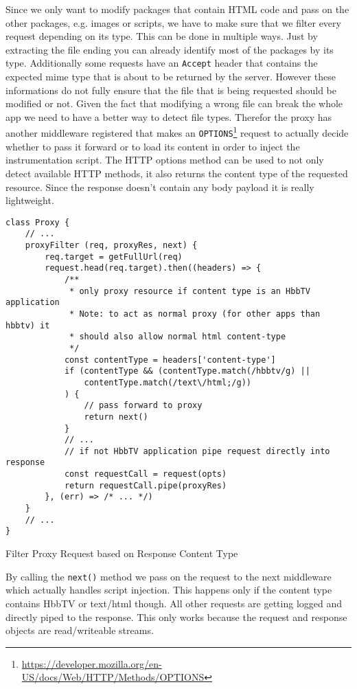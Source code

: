 Since we only want to modify packages that contain HTML code and pass on the other packages, e.g. images
or scripts, we have to make sure that we filter every request depending on its type. This can be done in
multiple ways. Just by extracting the file ending you can already identify most of the packages by its
type. Additionally some requests have an \texttt{Accept} header that contains the expected mime type that
is about to be returned by the server. However these informations do not fully ensure that the file that
is being requested should be modified or not. Given the fact that modifying a wrong file can break the
whole app we need to have a better way to detect file types. Therefor the proxy has another middleware
registered that makes an \texttt{OPTIONS}\footnote{\url{https://developer.mozilla.org/en-US/docs/Web/HTTP/Methods/OPTIONS}}
request to actually decide whether to pass it forward or to load its content in order to inject the
instrumentation script. The HTTP options method can be used to not only detect available HTTP methods,
it also returns the content type of the requested resource. Since the response doesn't contain any body
payload it is really lightweight.

\begin{listing}[H]
\begin{verbatim}
class Proxy {
    // ...
    proxyFilter (req, proxyRes, next) {
        req.target = getFullUrl(req)
        request.head(req.target).then((headers) => {
            /**
             * only proxy resource if content type is an HbbTV application
             * Note: to act as normal proxy (for other apps than hbbtv) it
             * should also allow normal html content-type
             */
            const contentType = headers['content-type']
            if (contentType && (contentType.match(/hbbtv/g) ||
                contentType.match(/text\/html;/g))
            ) {
                // pass forward to proxy
                return next()
            }
            // ...
            // if not HbbTV application pipe request directly into response
            const requestCall = request(opts)
            return requestCall.pipe(proxyRes)
        }, (err) => /* ... */)
    }
    // ...
}
\end{verbatim}
\caption{Filter Proxy Request based on Response Content Type}
\label{lst:proxyFilter}
\end{listing}

By calling the \texttt{next()} method we pass on the request to the next middleware which actually handles
script injection. This happens only if the content type contains HbbTV or text/html though. All other
requests are getting logged and directly piped to the response. This only works because the request and
response objects are read/writeable streams.

